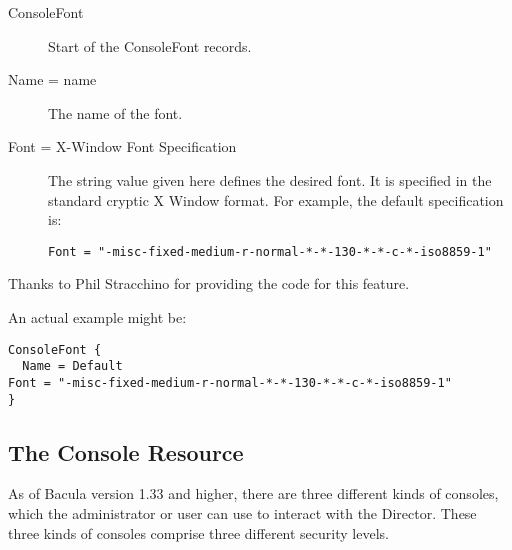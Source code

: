 \begin{description}

\item [ConsoleFont]
   Start of the ConsoleFont records. 

\item [Name = \lt{}name\gt{}]
   The name of the font. 

\item [Font = \lt{}X-Window Font Specification\gt{}]
   The string value given here defines the desired font. It  is specified in the
standard cryptic X Window format. For  example, the default specification is: 

\footnotesize
\begin{verbatim}
Font = "-misc-fixed-medium-r-normal-*-*-130-*-*-c-*-iso8859-1"
\end{verbatim}
\normalsize

\end{description}

Thanks to Phil Stracchino for providing the code for this feature. 

An actual example might be: 

\footnotesize
\begin{verbatim}
ConsoleFont {
  Name = Default
Font = "-misc-fixed-medium-r-normal-*-*-130-*-*-c-*-iso8859-1"
}
\end{verbatim}
\normalsize

\subsection*{The Console Resource}
\label{ConsoleResource}

As of Bacula version 1.33 and higher, there are three different kinds of
consoles, which the administrator or user can use to interact with the
Director. These three kinds of consoles comprise three different security
levels. 

